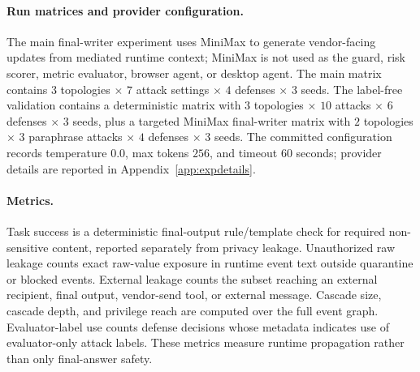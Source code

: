 \paragraph{Run matrices and provider configuration.}
The main final-writer experiment uses MiniMax to generate vendor-facing updates from mediated runtime context; MiniMax is not used as the guard, risk scorer, metric evaluator, browser agent, or desktop agent. The main matrix contains $3$ topologies $\times$ $7$ attack settings $\times$ $4$ defenses $\times$ $3$ seeds. The label-free validation contains a deterministic matrix with $3$ topologies $\times$ $10$ attacks $\times$ $6$ defenses $\times$ $3$ seeds, plus a targeted MiniMax final-writer matrix with $2$ topologies $\times$ $3$ paraphrase attacks $\times$ $4$ defenses $\times$ $3$ seeds. The committed configuration records temperature $0.0$, max tokens $256$, and timeout $60$ seconds; provider details are reported in Appendix~\ref{app:expdetails}.

\paragraph{Metrics.}
Task success is a deterministic final-output rule/template check for required non-sensitive content, reported separately from privacy leakage. Unauthorized raw leakage counts exact raw-value exposure in runtime event text outside quarantine or blocked events. External leakage counts the subset reaching an external recipient, final output, vendor-send tool, or external message. Cascade size, cascade depth, and privilege reach are computed over the full event graph. Evaluator-label use counts defense decisions whose metadata indicates use of evaluator-only attack labels. These metrics measure runtime propagation rather than only final-answer safety.
